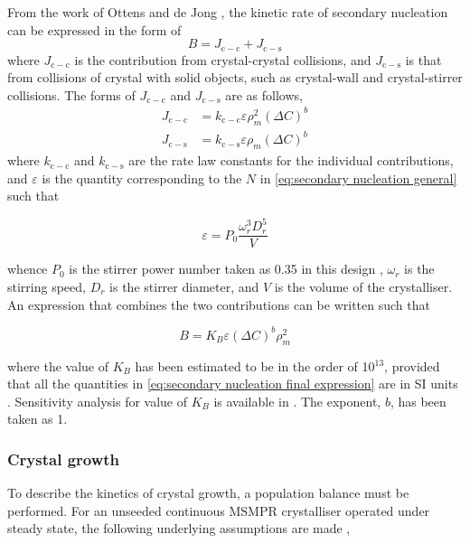 From the work of Ottens and de Jong \cite{ottens_model_1974}, the kinetic rate of secondary nucleation can be expressed in the form of 
\begin{equation}
    B = J_{\mathrm{c-c}} + J_{\mathrm{c-s}}
\end{equation}
 where $J_{\mathrm{c-c}}$ is the contribution from crystal-crystal collisions, and $J_{\mathrm{c-s}}$ is that from collisions of crystal with solid objects, such as crystal-wall and crystal-stirrer collisions. The forms of $J_{\mathrm{c-c}}$ and $J_{\mathrm{c-s}}$ are as follows,
\begin{align}
    J_{\mathrm{c-c}} &= k_{\mathrm{c-c}} \varepsilon \rho_m^2 (\Delta C)^b \\
    J_{\mathrm{c-s}} &= k_{\mathrm{c-s}} \varepsilon \rho_m (\Delta C)^b
\end{align}
where $k_{\mathrm{c-c}}$ and $k_{\mathrm{c-s}}$ are the rate law constants for the individual contributions, and $\varepsilon$ is the quantity corresponding to the $N$ in \cref{eq:secondary nucleation general} such that 

\begin{equation}
    \varepsilon = P_0 \frac{\omega_r^3 D_r^5}{V} 
\end{equation}

\noindent whence $P_0$ is the stirrer power number taken as 0.35 in this design \cite{ottens_model_1974}, $\omega_r$ is the stirring speed, $D_r$ is the stirrer diameter, and $V$ is the volume of the crystalliser. An expression that combines the two contributions can be written such that 

\begin{equation} \label{eq:secondary nucleation final expression}
    B = K_B \varepsilon (\Delta C)^b \rho_m^2
\end{equation}

\noindent where the value of $K_B$ has been estimated to be in the order of 10$^{13}$, provided that all the quantities in \cref{eq:secondary nucleation final expression} are in SI units \cite{bauer_contact_1974}. Sensitivity analysis for value of $K_B$ is available in . The exponent, $b$, has been taken as 1. 

\subsubsection{Crystal growth} \label{sec: crystal growth}

To describe the kinetics of crystal growth, a population balance must be performed. For an unseeded continuous MSMPR crystalliser operated under steady state, the following underlying assumptions are made \cite{richardson_chemical_2006} \cite{randolph_theory_1971},

